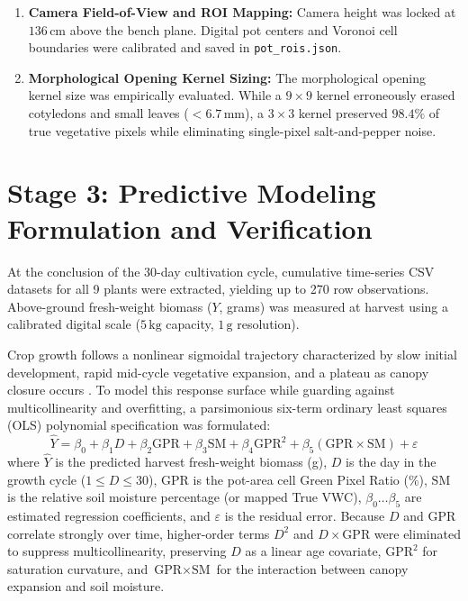 \begin{enumerate}
    \item \textbf{Camera Field-of-View and ROI Mapping:} Camera height was locked at $136\,\mathrm{cm}$ above the bench plane. Digital pot centers and Voronoi cell boundaries were calibrated and saved in \texttt{pot\_rois.json}.
    \item \textbf{Morphological Opening Kernel Sizing:} The morphological opening kernel size was empirically evaluated. While a $9 \times 9$ kernel erroneously erased cotyledons and small leaves ($< 6.7\,\mathrm{mm}$), a $3 \times 3$ kernel preserved $98.4\%$ of true vegetative pixels while eliminating single-pixel salt-and-pepper noise.
\end{enumerate}

\section{Stage 3: Predictive Modeling Formulation and Verification}

At the conclusion of the 30-day cultivation cycle, cumulative time-series CSV datasets for all 9 plants were extracted, yielding up to 270 row observations. Above-ground fresh-weight biomass ($Y$, grams) was measured at harvest using a calibrated digital scale ($5\,\mathrm{kg}$ capacity, $1\,\mathrm{g}$ resolution).

Crop growth follows a nonlinear sigmoidal trajectory characterized by slow initial development, rapid mid-cycle vegetative expansion, and a plateau as canopy closure occurs \cite{Archontoulis2015, Ding2022}. To model this response surface while guarding against multicollinearity and overfitting, a parsimonious six-term ordinary least squares (OLS) polynomial specification was formulated:
\begin{equation}
\hat{Y} = \beta_0 + \beta_1 D + \beta_2 \text{GPR} + \beta_3 \text{SM} + \beta_4 \text{GPR}^2 + \beta_5 (\text{GPR} \times \text{SM}) + \varepsilon
\label{eq:ols_model}
\end{equation}
where $\hat{Y}$ is the predicted harvest fresh-weight biomass (g), $D$ is the day in the growth cycle ($1 \le D \le 30$), $\text{GPR}$ is the pot-area cell Green Pixel Ratio (\%), $\text{SM}$ is the relative soil moisture percentage (or mapped True VWC), $\beta_0 \dots \beta_5$ are estimated regression coefficients, and $\varepsilon$ is the residual error. Because $D$ and $\text{GPR}$ correlate strongly over time, higher-order terms $D^2$ and $D \times \text{GPR}$ were eliminated to suppress multicollinearity, preserving $D$ as a linear age covariate, $\text{GPR}^2$ for saturation curvature, and $\text{GPR} \times \text{SM}$ for the interaction between canopy expansion and soil moisture.

